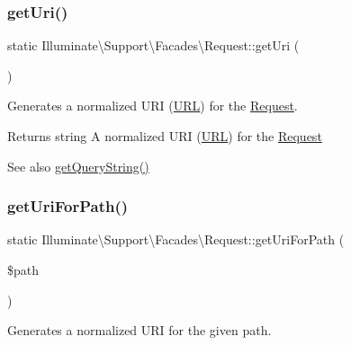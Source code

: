 \subsubsection{\texorpdfstring{get\+Uri()}{getUri()}}
{\footnotesize\ttfamily static Illuminate\textbackslash{}\+Support\textbackslash{}\+Facades\textbackslash{}\+Request\+::get\+Uri (\begin{DoxyParamCaption}{ }\end{DoxyParamCaption})\hspace{0.3cm}{\ttfamily [static]}}

Generates a normalized U\+RI (\mbox{\hyperlink{class_illuminate_1_1_support_1_1_facades_1_1_u_r_l}{U\+RL}}) for the \mbox{\hyperlink{class_illuminate_1_1_support_1_1_facades_1_1_request}{Request}}.

\begin{DoxyReturn}{Returns}
string A normalized U\+RI (\mbox{\hyperlink{class_illuminate_1_1_support_1_1_facades_1_1_u_r_l}{U\+RL}}) for the \mbox{\hyperlink{class_illuminate_1_1_support_1_1_facades_1_1_request}{Request}} 
\end{DoxyReturn}
\begin{DoxySeeAlso}{See also}
\mbox{\hyperlink{class_illuminate_1_1_support_1_1_facades_1_1_request_aec1fe0b0a5b7c90b9b3606f967083d82}{get\+Query\+String()}} 
\end{DoxySeeAlso}
\mbox{\label{class_illuminate_1_1_support_1_1_facades_1_1_request_a5f9581e38f5a7609b62f7fa4b1bd1116}} 
\subsubsection{\texorpdfstring{get\+Uri\+For\+Path()}{getUriForPath()}}
{\footnotesize\ttfamily static Illuminate\textbackslash{}\+Support\textbackslash{}\+Facades\textbackslash{}\+Request\+::get\+Uri\+For\+Path (\begin{DoxyParamCaption}\item[{}]{\$path }\end{DoxyParamCaption})\hspace{0.3cm}{\ttfamily [static]}}

Generates a normalized U\+RI for the given path.



